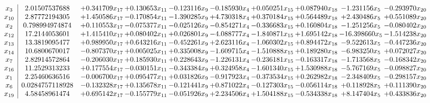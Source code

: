 \documentclass[10pt]{article}
\begin{document}
 \[\begin{array}{c| c c@{\hskip 2pt} c@{\hskip 2pt} c@{\hskip 2pt} c@{\hskip 2pt} c@{\hskip 2pt} c@{\hskip 2pt} c@{\hskip 2pt} c@{\hskip 2pt} }
 x_{3}   &  2.01507537688 & + 0.341709 x_{17} & + 0.130653 x_{11} & -0.123116 x_{9} & -0.185930 x_{4} & + 0.050251 x_{15} & + 0.087940 x_{18} & -1.231156 x_{5} & -0.293970 x_{20}\\
 x_{10}   &  2.87772194305 & + 1.450586 x_{17} & -0.170854 x_{11} & -1.390285 x_{9} & + 4.730318 x_{4} & + 0.370184 x_{15} & + 0.564489 x_{18} & + 2.430486 x_{5} & + 0.551089 x_{20}\\
 x_{2}   &  0.798994974874 & + 0.110553 x_{17} & -0.075377 x_{11} & -0.025126 x_{9} & -0.854271 x_{4} & -0.336683 x_{15} & + 0.160804 x_{18} & -1.251256 x_{5} & -0.080402 x_{20}\\
 x_{12}   &  17.2144053601 & + 1.415410 x_{17} & + 0.080402 x_{11} & + 0.026801 x_{9} & -4.088777 x_{4} & -1.840871 x_{15} & + 1.695142 x_{18} & -16.398660 x_{5} & -1.514238 x_{20}\\
 x_{13}   &  13.3819095477 & + 0.989950 x_{17} & + 0.643216 x_{11} & -0.452261 x_{9} & + 2.623116 x_{4} & -1.060302 x_{15} & + 0.894472 x_{18} & -9.522613 x_{5} & -0.447236 x_{20}\\
 x_{14}   &  10.6800670017 & -0.807370 x_{17} & + 0.005025 x_{11} & + 0.335008 x_{9} & -1.609715 x_{4} & -1.510888 x_{15} & + 0.189280 x_{18} & -6.983250 x_{5} & + 0.072027 x_{20}\\
 x_{7}   &  2.82914572864 & -0.206030 x_{17} & + 0.185930 x_{11} & + 0.228643 x_{9} & -1.226131 x_{4} & -0.236181 x_{15} & -0.163317 x_{18} & -1.713568 x_{5} & -0.168342 x_{20}\\
 x_{16}   &  11.2529313233 & + 0.177554 x_{17} & -0.030151 x_{11} & -0.343384 x_{9} & + 0.324958 x_{4} & -1.601340 x_{15} & + 1.530988 x_{18} & -5.767169 x_{5} & -0.098827 x_{20}\\
 x_{1}   &  2.25460636516 & -0.006700 x_{17} & + 0.095477 x_{11} & + 0.031826 x_{9} & -0.917923 x_{4} & -0.373534 x_{15} & + 0.262982 x_{18} & -2.348409 x_{5} & -0.298157 x_{20}\\
 x_{6}   &  0.0284757118928 & -0.132328 x_{17} & + 0.135678 x_{11} & -0.121441 x_{9} & + 0.871022 x_{4} & -0.127303 x_{15} & -0.056114 x_{18} & + 0.118928 x_{5} & + 0.111390 x_{20}\\
 x_{19}   &  4.58458961474 & + 0.695142 x_{17} & -0.155779 x_{11} & -0.051926 x_{9} & + 2.234506 x_{4} & + 1.504188 x_{15} & -0.534338 x_{18} & + 8.147404 x_{5} & + 0.433836 x_{20}\\

\end{array}\]
\end{document}

